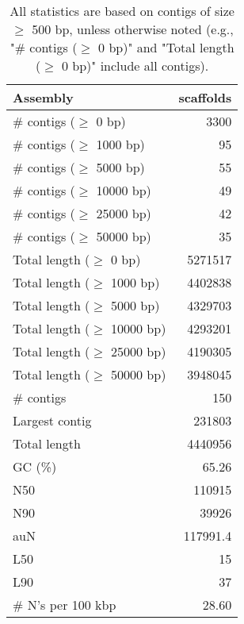 \documentclass[12pt,a4paper]{article}
\begin{document}
\begin{table}[ht]
\begin{center}
\caption{All statistics are based on contigs of size $\geq$ 500 bp, unless otherwise noted (e.g., "\# contigs ($\geq$ 0 bp)" and "Total length ($\geq$ 0 bp)" include all contigs).}
\begin{tabular}{|l*{1}{|r}|}
\hline
Assembly & scaffolds \\ \hline
\# contigs ($\geq$ 0 bp) & 3300 \\ \hline
\# contigs ($\geq$ 1000 bp) & 95 \\ \hline
\# contigs ($\geq$ 5000 bp) & 55 \\ \hline
\# contigs ($\geq$ 10000 bp) & 49 \\ \hline
\# contigs ($\geq$ 25000 bp) & 42 \\ \hline
\# contigs ($\geq$ 50000 bp) & 35 \\ \hline
Total length ($\geq$ 0 bp) & 5271517 \\ \hline
Total length ($\geq$ 1000 bp) & 4402838 \\ \hline
Total length ($\geq$ 5000 bp) & 4329703 \\ \hline
Total length ($\geq$ 10000 bp) & 4293201 \\ \hline
Total length ($\geq$ 25000 bp) & 4190305 \\ \hline
Total length ($\geq$ 50000 bp) & 3948045 \\ \hline
\# contigs & 150 \\ \hline
Largest contig & 231803 \\ \hline
Total length & 4440956 \\ \hline
GC (\%) & 65.26 \\ \hline
N50 & 110915 \\ \hline
N90 & 39926 \\ \hline
auN & 117991.4 \\ \hline
L50 & 15 \\ \hline
L90 & 37 \\ \hline
\# N's per 100 kbp & 28.60 \\ \hline
\end{tabular}
\end{center}
\end{table}
\end{document}
